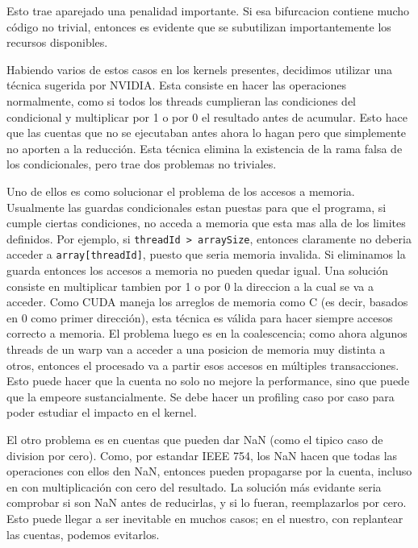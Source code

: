 Esto trae aparejado una penalidad importante. Si esa bifurcacion contiene mucho c\'odigo no trivial,
entonces es evidente que se subutilizan importantemente los recursos disponibles.

Habiendo varios de estos casos en los kernels presentes, decidimos utilizar una t\'ecnica sugerida
por NVIDIA. Esta consiste en hacer las operaciones normalmente, como si todos los threads cumplieran
las condiciones del condicional y multiplicar por 1 o por 0 el resultado antes de acumular.
Esto hace que las cuentas que no se ejecutaban antes ahora lo hagan pero que simplemente no aporten
a la reducci\'on. Esta t\'ecnica elimina la existencia de la rama falsa de los condicionales, pero
trae dos problemas no triviales.

Uno de ellos es como solucionar el problema de los accesos a memoria.
Usualmente las guardas condicionales estan puestas para que el programa, si cumple ciertas condiciones,
no acceda a memoria que esta mas alla de los limites definidos. Por ejemplo, si \texttt{threadId > arraySize}, entonces claramente
no deberia acceder a \texttt{array[threadId]}, puesto que seria memoria invalida. Si eliminamos la guarda
entonces los accesos a memoria no pueden quedar igual. Una soluci\'on consiste en multiplicar tambien
por 1 o por 0 la direccion a la cual se va a acceder. Como CUDA maneja los arreglos de memoria
como C (es decir, basados en 0 como primer direcci\'on), esta t\'ecnica es v\'alida para hacer
siempre accesos correcto a memoria. El problema luego es en la coalescencia; como ahora algunos
threads de un warp van a acceder a una posicion de memoria muy distinta a otros, entonces el procesado
va a partir esos accesos en m\'ultiples transacciones. Esto puede hacer que la cuenta no solo no mejore
la performance, sino que puede que la empeore sustancialmente. Se debe hacer un profiling caso
por caso para poder estudiar el impacto en el kernel.

El otro problema es en cuentas que pueden dar NaN (como el tipico caso de division por cero).
Como, por estandar IEEE 754, los NaN hacen que todas las operaciones con ellos den NaN,
entonces pueden propagarse por la cuenta, incluso en con multiplicaci\'on con cero del resultado.
La soluci\'on m\'as evidante seria comprobar si son NaN antes de reducirlas, y si lo fueran, reemplazarlos
por cero. Esto puede llegar a ser inevitable en muchos casos; en el nuestro, con replantear las cuentas,
podemos evitarlos.

